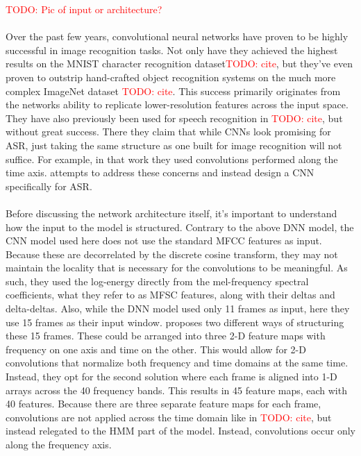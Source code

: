 \documentclass[letterpaper]{article}
\newcommand{\TODO}[1]{\textcolor{red}{TODO: #1}}
\begin{document}
\TODO{Pic of input or architecture?}

\paragraph{} Over the past few years, convolutional neural networks have proven to be highly successful in image recognition tasks. Not only have they achieved the highest results on the MNIST character recognition dataset\TODO{cite}, but they've even proven to outstrip hand-crafted object recognition systems on the much more complex ImageNet dataset \TODO{cite}. This success primarily originates from the networks ability to replicate lower-resolution features across the input space. They have also previously been used for speech recognition in \TODO{cite}, but without great success. There they claim that while CNNs look promising for ASR, just taking the same structure as one built for image recognition will not suffice. For example, in that work they used convolutions performed along the time axis. \cite{DBLP:journals/taslp/Abdel-HamidMJDPY14} attempts to address these concerns and instead design a CNN specifically for ASR.

\paragraph{} Before discussing the network architecture itself, it's important to understand how the input to the model is structured. Contrary to the above DNN model, the CNN model used here does not use the standard MFCC features as input. Because these are decorrelated by the discrete cosine transform, they may not maintain the locality that is necessary for the convolutions to be meaningful. As such, they used the log-energy directly from the mel-frequency spectral coefficients, what they refer to as MFSC features, along with their deltas and delta-deltas. Also, while the DNN model used only 11 frames as input, here they use 15 frames as their input window. \cite{DBLP:journals/taslp/Abdel-HamidMJDPY14} proposes two different ways of structuring these 15 frames. These could be arranged into three 2-D feature maps with frequency on one axis and time on the other. This would allow for 2-D convolutions that normalize both frequency and time domains at the same time. Instead, they opt for the second solution where each frame is aligned into 1-D arrays across the 40 frequency bands. This results in 45 feature maps, each with 40 features. Because there are three separate feature maps for each frame, convolutions are not applied across the time domain like in \TODO{cite}, but instead relegated to the HMM part of the model. Instead, convolutions occur only along the frequency axis.
\end{document}
